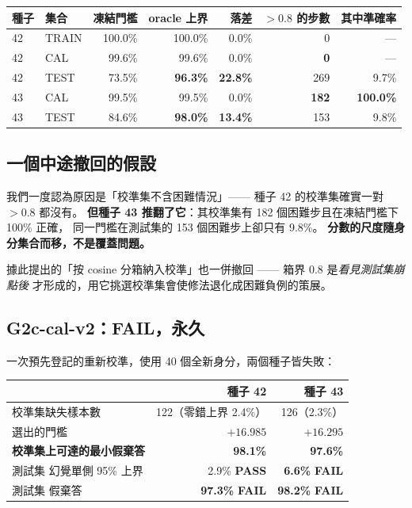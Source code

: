\documentclass[11pt, a4paper]{article}
\newcommand{\PASS}{\textcolor{green!45!black}{\textbf{PASS}}}
\newcommand{\FAIL}{\textcolor{red!70!black}{\textbf{FAIL}}}
\begin{document}
\begin{table}[h]
\centering
\small
\begin{tabular}{llrrrrr}
\toprule
種子 & 集合 & 凍結門檻 & oracle 上界 & 落差 & $>0.8$ 的步數 & 其中準確率 \\
\midrule
42 & TRAIN & 100.0\% & 100.0\% & 0.0\% & 0 & --- \\
42 & CAL & 99.6\% & 99.6\% & 0.0\% & \textbf{0} & --- \\
42 & TEST & 73.5\% & \textbf{96.3\%} & \textbf{22.8\%} & 269 & 9.7\% \\
43 & CAL & 99.5\% & 99.5\% & 0.0\% & \textbf{182} & \textbf{100.0\%} \\
43 & TEST & 84.6\% & \textbf{98.0\%} & \textbf{13.4\%} & 153 & 9.8\% \\
\bottomrule
\end{tabular}
\end{table}

\subsection{一個中途撤回的假設}

我們一度認為原因是「校準集不含困難情況」—— 種子 42 的校準集確實一對 $>0.8$ 都沒有。
\textbf{但種子 43 推翻了它}：其校準集有 182 個困難步且在凍結門檻下 100\% 正確，
同一門檻在測試集的 153 個困難步上卻只有 9.8\%。
\textbf{分數的尺度隨身分集合而移，不是覆蓋問題。}

據此提出的「按 cosine 分箱納入校準」也一併撤回 —— 箱界 0.8 是\emph{看見測試集崩點後}
才形成的，用它挑選校準集會使修法退化成困難負例的策展。

\subsection{G2c-cal-v2：\FAIL{}，永久}

一次預先登記的重新校準，使用 40 個全新身分，兩個種子皆失敗：

\begin{table}[h]
\centering
\small
\begin{tabular}{lrr}
\toprule
& 種子 42 & 種子 43 \\
\midrule
校準集缺失樣本數 & 122（零錯上界 2.4\%）& 126（2.3\%）\\
選出的門檻 & $+16.985$ & $+16.295$ \\
\textbf{校準集上可達的最小假棄答} & \textbf{98.1\%} & \textbf{97.6\%} \\
測試集 幻覺單側 95\% 上界 & 2.9\% \PASS{} & \textbf{6.6\%} \FAIL{} \\
測試集 假棄答 & \textbf{97.3\%} \FAIL{} & \textbf{98.2\%} \FAIL{} \\
\bottomrule
\end{tabular}
\end{table}
\end{document}
